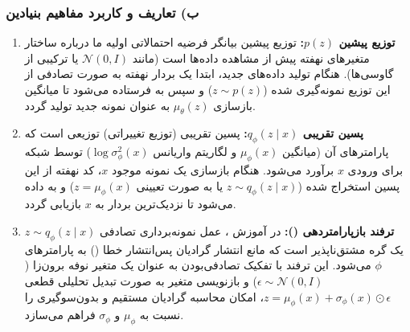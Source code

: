 \subsubsection{ب) تعاریف و کاربرد مفاهیم بنیادین }
\begin{enumerate}
  \item \textbf{توزیع پیشین $p(z)$:} توزیع پیشین بیانگر فرضیه احتمالاتی اولیه ما درباره ساختار متغیرهای نهفته پیش از مشاهده داده‌ها است (مانند $\mathcal{N}(0, I)$ یا ترکیبی از گاوسی‌ها). هنگام تولید داده‌های جدید، ابتدا یک بردار نهفته به صورت تصادفی از این توزیع نمونه‌گیری شده ($z \sim p(z)$) و سپس به  فرستاده می‌شود تا میانگین بازسازی $\mu_\theta(z)$ به عنوان نمونه جدید تولید گردد.
  \item \textbf{پسین تقریبی $q_\phi(z \mid x)$:} پسین تقریبی (توزیع تغییراتی) توزیعی است که پارامترهای آن (میانگین $\mu_\phi(x)$ و لگاریتم واریانس $\log\sigma_\phi^2(x)$) توسط شبکه  برای ورودی $x$ برآورد می‌شود. هنگام بازسازی یک نمونه موجود $x$، کد نهفته از این پسین استخراج شده ($z \sim q_\phi(z \mid x)$ یا به صورت تعیینی $z = \mu_\phi(x)$) و به  داده می‌شود تا نزدیک‌ترین بردار به $x$ بازیابی گردد.
  \item \textbf{ترفند بازپارامتردهی ():} در آموزش ، عمل نمونه‌برداری تصادفی $z \sim q_\phi(z \mid x)$ یک گره مشتق‌ناپذیر است که مانع انتشار گرادیان پس‌انتشار خطا () به پارامترهای  $\phi$ می‌شود. این ترفند با تفکیک تصادفی‌بودن به عنوان یک متغیر نوفه برون‌زا ($\epsilon \sim \mathcal{N}(0, I)$) و بازنویسی متغیر به صورت تبدیل تحلیلی قطعی $z = \mu_\phi(x) + \sigma_\phi(x) \odot \epsilon$، امکان محاسبه گرادیان مستقیم و بدون‌سوگیری را نسبت به $\mu_\phi$ و $\sigma_\phi$ فراهم می‌سازد.
\end{enumerate}

